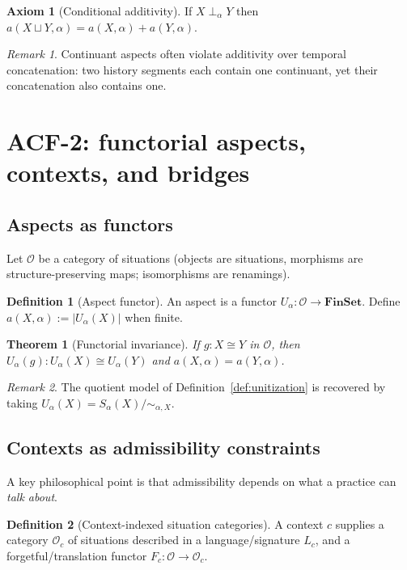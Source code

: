 \documentclass[11pt]{article}
\theoremstyle{definition}
\newtheorem{definition}{Definition}[section]
\newtheorem{axiom}{Axiom}[section]
\theoremstyle{plain}
\newtheorem{theorem}{Theorem}[section]
\theoremstyle{remark}
\newtheorem{remark}{Remark}[section]
\newcommand{\FinSet}{\mathbf{FinSet}}
\begin{document}
\begin{axiom}[Conditional additivity]\label{ax:add}
If $X\perp_\alpha Y$ then $a(X\sqcup Y,\alpha)=a(X,\alpha)+a(Y,\alpha)$.
\end{axiom}

\begin{remark}
Continuant aspects often violate additivity over temporal concatenation: two history segments each contain one continuant, yet their concatenation also contains one.
\end{remark}

\section{ACF-2: functorial aspects, contexts, and bridges}

\subsection{Aspects as functors}
Let $\mathcal O$ be a category of situations (objects are situations, morphisms are structure-preserving maps; isomorphisms are renamings).

\begin{definition}[Aspect functor]\label{def:functor}
An aspect is a functor $U_\alpha:\mathcal O\to\FinSet$.
Define $a(X,\alpha):=|U_\alpha(X)|$ when finite.
\end{definition}

\begin{theorem}[Functorial invariance]
If $g:X\cong Y$ in $\mathcal O$, then $U_\alpha(g):U_\alpha(X)\cong U_\alpha(Y)$ and $a(X,\alpha)=a(Y,\alpha)$.
\end{theorem}

\begin{remark}
The quotient model of Definition~\ref{def:unitization} is recovered by taking $U_\alpha(X)=S_\alpha(X)/\sim_{\alpha,X}$.
\end{remark}

\subsection{Contexts as admissibility constraints}
A key philosophical point is that admissibility depends on what a practice can \emph{talk about}.

\begin{definition}[Context-indexed situation categories]
A context $c$ supplies a category $\mathcal O_c$ of situations described in a language/signature $L_c$, and a forgetful/translation functor $F_c:\mathcal O\to\mathcal O_c$.
\end{definition}
\end{document}
